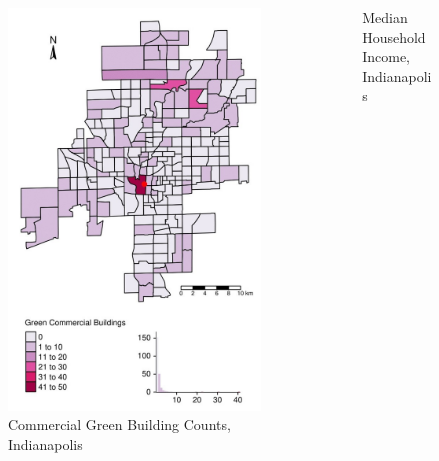 \documentclass[11pt]{beamer}
\begin{document}
\begin{frame}
\begin{columns}
\begin{column}{0.48\textwidth}
\begin{figure}
\caption{Commercial Green Building Counts, Indianapolis}
\centering
\includegraphics[width=.8\textwidth]{indComCounts-1.jpg}
\end{figure}
\end{column}
\begin{column}{0.48\textwidth}
\begin{figure}
\caption{Median Household Income, Indianapolis}
\centering

\end{figure}
\end{column}
\end{columns}
\end{frame}
\end{document}
